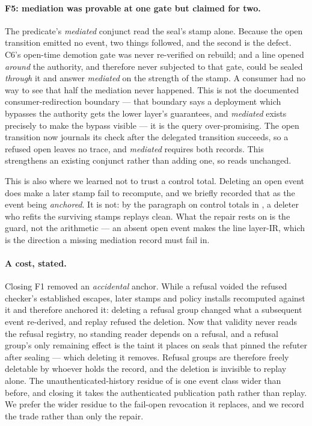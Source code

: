\documentclass[11pt,a4paper]{article}
\theoremstyle{plain}
\theoremstyle{definition}
\theoremstyle{remark}
\begin{document}
\paragraph{F5: mediation was provable at one gate but claimed for two.} The predicate's \emph{mediated} conjunct read the seal's stamp alone. Because the open transition emitted no event, two things followed, and the second is the defect. C6's open-time demotion gate was never re-verified on rebuild; and a line opened \emph{around} the authority, and therefore never subjected to that gate, could be sealed \emph{through} it and answer \emph{mediated} on the strength of the stamp. A consumer had no way to see that half the mediation never happened. This is not the documented consumer-redirection boundary --- that boundary says a deployment which bypasses the authority gets the lower layer's guarantees, and \emph{mediated} exists precisely to make the bypass visible --- it is the query over-promising. The open transition now journals its check after the delegated transition succeeds, so a refused open leaves no trace, and \emph{mediated} requires both records. This strengthens an existing conjunct rather than adding one, so  reads unchanged.

This is also where we learned not to trust a control total. Deleting an open event does make a later stamp fail to recompute, and we briefly recorded that as the event being \emph{anchored}. It is not: by the paragraph on control totals in , a deleter who refits the surviving stamps replays clean. What the repair rests on is the guard, not the arithmetic --- an absent open event makes the line layer-IR, which is the direction a missing mediation record must fail in.

\paragraph{A cost, stated.} Closing F1 removed an \emph{accidental} anchor. While a refusal voided the refused checker's established escapes, later stamps and policy installs recomputed against it and therefore anchored it: deleting a refusal group changed what a subsequent event re-derived, and replay refused the deletion. Now that validity never reads the refusal registry, no standing reader depends on a refusal, and a refusal group's only remaining effect is the taint it places on seals that pinned the refuter after sealing --- which deleting it removes. Refusal groups are therefore freely deletable by whoever holds the record, and the deletion is invisible to replay alone. The unauthenticated-history residue of  is one event class wider than before, and closing it takes the authenticated publication path rather than replay. We prefer the wider residue to the fail-open revocation it replaces, and we record the trade rather than only the repair.
\end{document}
